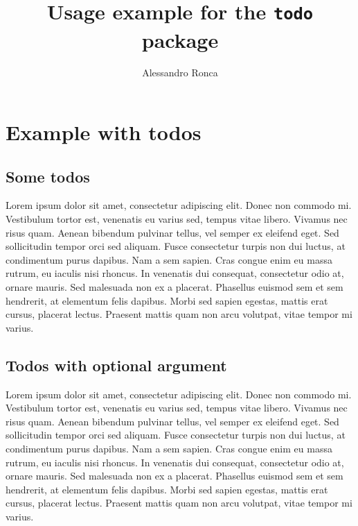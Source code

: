 \documentclass[11pt, a4paper, draft]{article}
\title{Usage example for the \texttt{todo} package}
\author{Alessandro Ronca}
\begin{document}
\maketitle
\tableofcontents
\listoftodo %


\section{Example with todos}

\subsection{Some todos}
Lorem ipsum dolor sit amet, consectetur adipiscing elit. 
Donec non commodo mi. %
Vestibulum tortor est, venenatis eu varius sed, tempus vitae libero.
Vivamus nec risus quam.
Aenean bibendum pulvinar tellus, vel semper ex eleifend eget.
Sed sollicitudin tempor orci sed aliquam.
Fusce consectetur turpis non dui luctus, at condimentum purus dapibus.
Nam a sem sapien.
Cras congue enim eu massa rutrum, eu iaculis nisi rhoncus.
In venenatis dui consequat, consectetur odio at, ornare mauris.
Sed malesuada non ex a placerat.
Phasellus euismod sem et sem hendrerit, at elementum felis dapibus. 
Morbi sed sapien egestas, mattis erat cursus, placerat lectus.                               %
Praesent mattis quam non arcu volutpat, vitae tempor mi varius.

\subsection{Todos with optional argument}
Lorem ipsum dolor sit amet, consectetur adipiscing elit. 
Donec non commodo mi. %
Vestibulum tortor est, venenatis eu varius sed, tempus vitae libero.
Vivamus nec risus quam.
Aenean bibendum pulvinar tellus, vel semper ex eleifend eget.
Sed sollicitudin tempor orci sed aliquam.
Fusce consectetur turpis non dui luctus, at condimentum purus dapibus.
Nam a sem sapien.
Cras congue enim eu massa rutrum, eu iaculis nisi rhoncus.
In venenatis dui consequat, consectetur odio at, ornare mauris.
Sed malesuada non ex a placerat.
Phasellus euismod sem et sem hendrerit, at elementum felis dapibus. 
Morbi sed sapien egestas, mattis erat cursus, placerat lectus.                                                %
Praesent mattis quam non arcu volutpat, vitae tempor mi varius.
\end{document}
